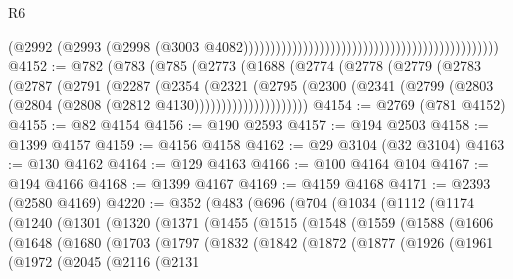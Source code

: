 \begin{lexlean}{R6}
\begin{coremodule}
                                                                                          (@2992
                                                                                            (@2993
                                                                                              (@2998
                                                                                                (@3003
                                                                                                  @4082)))))))))))))))))))))))))))))))))))))))))))))))
@4152 := @782
    (@783
      (@785
        (@2773
          (@1688
            (@2774
              (@2778
                (@2779
                  (@2783
                    (@2787
                      (@2791
                        (@2287
                          (@2354
                            (@2321
                              (@2795
                                (@2300
                                  (@2341
                                    (@2799 (@2803 (@2804 (@2808 (@2812 @4130)))))))))))))))))))))
@4154 := @2769 (@781 @4152)
@4155 := @82 @4154
@4156 := @190 @2593
@4157 := @194 @2503
@4158 := @1399 @4157
@4159 := @4156 @4158
@4162 := @29 @3104 (@32 @3104)
@4163 := @130 @4162
@4164 := @129 @4163
@4166 := @100 @4164 @104
@4167 := @194 @4166
@4168 := @1399 @4167
@4169 := @4159 @4168
@4171 := @2393 (@2580 @4169)
@4220 := @352
    (@483
      (@696
        (@704
          (@1034
            (@1112
              (@1174
                (@1240
                  (@1301
                    (@1320
                      (@1371
                        (@1455
                          (@1515
                            (@1548
                              (@1559
                                (@1588
                                  (@1606
                                    (@1648
                                      (@1680
                                        (@1703
                                          (@1797
                                            (@1832
                                              (@1842
                                                (@1872
                                                  (@1877
                                                    (@1926
                                                      (@1961
                                                        (@1972
                                                          (@2045
                                                            (@2116
                                                              (@2131

\end{coremodule}
\end{lexlean}
